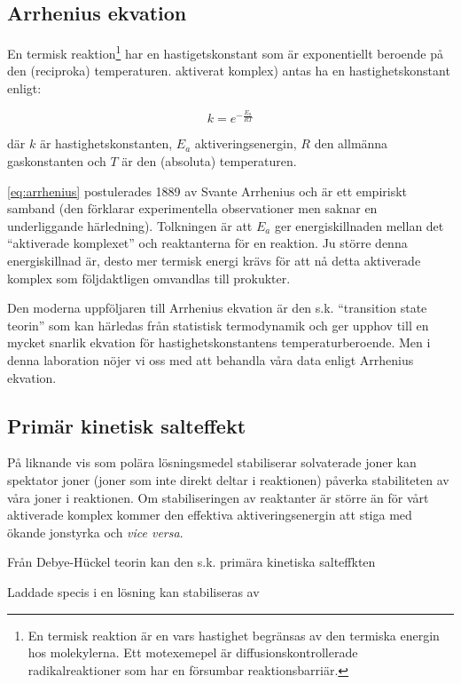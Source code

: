 \subsection{Arrhenius ekvation}
En termisk reaktion\footnote{En termisk reaktion är en vars hastighet begränsas av den termiska
energin hos molekylerna. Ett motexemepel är diffusionskontrollerade
radikalreaktioner som har en försumbar reaktionsbarriär.} har en
hastigetskonstant som är exponentiellt beroende på den (reciproka) temperaturen.
aktiverat komplex) antas ha en hastighetskonstant enligt:

\begin{equation}
  \label{eq:arrhenius}
  k = e^{-\frac{E_a}{RT}}
\end{equation}

där $k$ är hastighetskonstanten, $E_a$ aktiveringsenergin, $R$ den
allmänna gaskonstanten och $T$ är den (absoluta) temperaturen.

\cref{eq:arrhenius} postulerades 1889 av Svante Arrhenius och är ett
empiriskt samband (den förklarar experimentella observationer men saknar
en underliggande härledning). Tolkningen är att $E_a$ ger
energiskillnaden mellan det ``aktiverade komplexet'' och reaktanterna för
en reaktion. Ju större denna energiskillnad är, desto mer termisk energi
krävs för att nå detta aktiverade komplex som följdaktligen omvandlas
till prokukter.

Den moderna uppföljaren till Arrhenius ekvation är den s.k. ``transition
state teorin'' som kan härledas från statistisk termodynamik och ger
upphov till en mycket snarlik ekvation för hastighetskonstantens
temperaturberoende. Men i denna laboration nöjer vi oss med att behandla
våra data enligt Arrhenius ekvation.

\subsection{Primär kinetisk salteffekt}
På liknande vis som polära lösningsmedel stabiliserar
solvaterade joner kan spektator joner (joner som inte
direkt deltar i reaktionen) påverka stabiliteten av våra joner i
reaktionen. Om stabiliseringen av reaktanter är större än för vårt
aktiverade komplex kommer den effektiva aktiveringsenergin att stiga med
ökande jonstyrka och \emph{vice versa}.

Från Debye-Hückel teorin kan den s.k. primära kinetiska
salteffkten 


Laddade specis i en lösning kan stabiliseras av  


